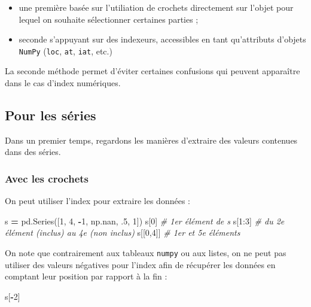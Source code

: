 \documentclass[12pt,]{book}
\newenvironment{Shaded}{\begin{snugshade}}{\end{snugshade}}
\newcommand{\DecValTok}[1]{\textcolor[rgb]{0.00,0.00,0.81}{#1}}
\newcommand{\CommentTok}[1]{\textcolor[rgb]{0.56,0.35,0.01}{\textit{#1}}}
\newcommand{\OperatorTok}[1]{\textcolor[rgb]{0.81,0.36,0.00}{\textbf{#1}}}
\newcommand{\NormalTok}[1]{#1}
\providecommand{\tightlist}{%
  \setlength{\itemsep}{0pt}\setlength{\parskip}{0pt}}
\numberwithin{equation}{section}
\numberwithin{countremarque}{section}
\begin{document}
\begin{itemize}
\tightlist
\item
  une première basée sur l'utiliation de crochets directement sur
  l'objet pour lequel on souhaite sélectionner certaines parties ;
\item
  seconde s'appuyant sur des indexeurs, accessibles en tant qu'attributs
  d'objets \texttt{NumPy} (\texttt{loc}, \texttt{at}, \texttt{iat},
  etc.)
\end{itemize}

La seconde méthode permet d'éviter certaines confusions qui peuvent
apparaître dans le cas d'index numériques.

\subsection{Pour les séries}\label{pour-les-series}

Dans un premier temps, regardons les manières d'extraire des valeurs
contenues dans des séries.

\subsubsection{Avec les crochets}\label{avec-les-crochets}

On peut utiliser l'index pour extraire les données :

\begin{Shaded}
\begin{Highlighting}[]
\NormalTok{s }\OperatorTok{=}\NormalTok{ pd.Series([}\DecValTok{1}\NormalTok{, }\DecValTok{4}\NormalTok{, }\OperatorTok{-}\DecValTok{1}\NormalTok{, np.nan, .}\DecValTok{5}\NormalTok{, }\DecValTok{1}\NormalTok{])}
\NormalTok{s[}\DecValTok{0}\NormalTok{] }\CommentTok{# 1er élément de s}
\NormalTok{s[}\DecValTok{1}\NormalTok{:}\DecValTok{3}\NormalTok{] }\CommentTok{# du 2e élément (inclus) au 4e (non inclus)}
\NormalTok{s[[}\DecValTok{0}\NormalTok{,}\DecValTok{4}\NormalTok{]] }\CommentTok{# 1er et 5e éléments}
\end{Highlighting}
\end{Shaded}

On note que contrairement aux tableaux \texttt{numpy} ou aux listes, on
ne peut pas utiliser des valeurs négatives pour l'index afin de
récupérer les données en comptant leur position par rapport à la fin :

\begin{Shaded}
\begin{Highlighting}[]
\NormalTok{s[}\OperatorTok{-}\DecValTok{2}\NormalTok{]}
\end{Highlighting}
\end{Shaded}
\end{document}
